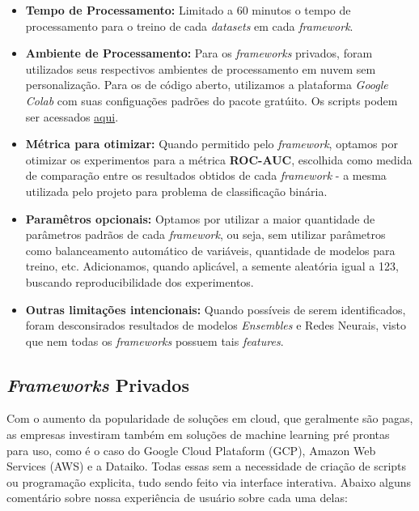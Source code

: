 \documentclass[9pt, a4paper, twocolumn]{article}
\begin{document}
\begin{itemize}
\item
  \textbf{Tempo de Processamento:} Limitado a 60 minutos o tempo de processamento para o treino de cada \emph{datasets} em cada \emph{framework}.
\item
  \textbf{Ambiente de Processamento:} Para os \emph{frameworks} privados, foram utilizados seus respectivos ambientes de processamento em nuvem sem personalização. Para os de código aberto, utilizamos a plataforma \emph{Google Colab} com suas configuações padrões do pacote gratúito. Os scripts podem ser acessados \href{https://github.com/Luizgs7/Especializacao_Data_Science_Big_Data_Monografia/tree/main/code}{aqui}.
\item
  \textbf{Métrica para otimizar:} Quando permitido pelo \emph{framework}, optamos por otimizar os experimentos para a métrica \textbf{ROC-AUC}, escolhida como medida de comparação entre os resultados obtidos de cada \emph{framework} - a mesma utilizada pelo projeto \cite{amlb2019} para problema de classificação binária.
\item
  \textbf{Paramêtros opcionais:} Optamos por utilizar a maior quantidade de parâmetros padrãos de cada \emph{framework}, ou seja, sem utilizar parâmetros como balanceamento automático de variáveis, quantidade de modelos para treino, etc. Adicionamos, quando aplicável, a semente aleatória igual a 123, buscando reproducibilidade dos experimentos.
\item
  \textbf{Outras limitações intencionais:} Quando possíveis de serem identificados, foram desconsirados resultados de modelos \emph{Ensembles} e Redes Neurais, visto que nem todas os \emph{frameworks} possuem tais \emph{features}.
\end{itemize}

\hypertarget{frameworks-privados}{%
\subsection{\texorpdfstring{\emph{Frameworks} Privados}{Frameworks Privados}}\label{frameworks-privados}}

Com o aumento da popularidade de soluções em cloud, que geralmente são pagas, as empresas investiram também em soluções de machine learning pré prontas para uso, como é o caso do Google Cloud Plataform (GCP), Amazon Web Services (AWS) e a Dataiko. Todas essas sem a necessidade de criação de scripts ou programação explicita, tudo sendo feito via interface interativa. Abaixo alguns comentário sobre nossa experiência de usuário sobre cada uma delas:
\end{document}
